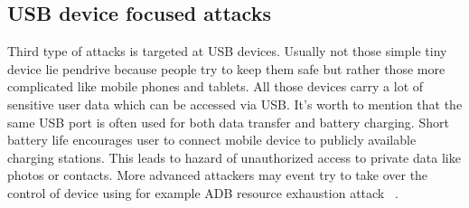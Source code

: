 \documentclass[10pt, a5paper]{article}
\begin{document}
\subsection*{USB device focused attacks}
Third type of attacks is targeted at USB devices. Usually not those simple tiny device lie pendrive because people try to keep them safe but rather those more complicated like mobile phones and tablets. All those devices carry a lot of sensitive user data which can be accessed via USB. It’s worth to mention that the same USB port is often used for both data transfer and battery charging. Short battery life encourages user to connect mobile device to publicly available charging stations.
This leads to hazard of unauthorized access to private data like photos or contacts. More advanced attackers may event try to take over the control of device using for example ADB resource exhaustion attack  ~\cite{Opasiak-10}.
\end{document}
